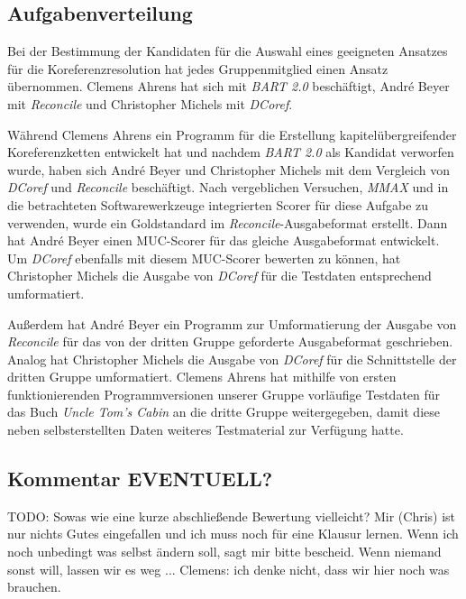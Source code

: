 \documentclass[a4paper,12pt,titlepage=true, ngerman]{scrartcl}
\begin{document}
\subsection{Aufgabenverteilung}%

Bei der Bestimmung der Kandidaten für die Auswahl eines geeigneten Ansatzes für die Koreferenzresolution 
hat jedes Gruppenmitglied einen Ansatz übernommen. 
Clemens Ahrens hat sich mit \emph{BART 2.0} beschäftigt, André Beyer mit \emph{Reconcile} und 
Christopher Michels mit \emph{DCoref}.

Während Clemens Ahrens ein Programm für die Erstellung kapitelübergreifender Koreferenzketten entwickelt hat 
und nachdem \emph{BART 2.0} als Kandidat verworfen wurde, 
haben sich André Beyer und Christopher Michels mit dem Vergleich von \emph{DCoref} 
und \emph{Reconcile} beschäftigt. 
Nach vergeblichen Versuchen, \emph{MMAX} und in die betrachteten Softwarewerkzeuge integrierten Scorer 
für diese Aufgabe zu verwenden, wurde ein Goldstandard im \emph{Reconcile}-Ausgabeformat erstellt. 
Dann hat André Beyer einen MUC-Scorer für das gleiche Ausgabeformat entwickelt. 
Um \emph{DCoref} ebenfalls mit diesem MUC-Scorer bewerten zu können, 
hat Christopher Michels die Ausgabe von \emph{DCoref} für die Testdaten entsprechend umformatiert.

Außerdem hat André Beyer ein Programm zur Umformatierung der Ausgabe von \emph{Reconcile} für das 
von der dritten Gruppe geforderte Ausgabeformat geschrieben. 
Analog hat Christopher Michels die Ausgabe von \emph{DCoref} für die Schnittstelle der dritten Gruppe umformatiert. 
Clemens Ahrens hat mithilfe von ersten funktionierenden Programmversionen unserer Gruppe vorläufige Testdaten 
für das Buch \emph{Uncle Tom's Cabin} \autocite[]{chris_uncle} an die dritte Gruppe weitergegeben, 
damit diese neben selbsterstellten Daten weiteres Testmaterial zur Verfügung hatte.


\subsection{Kommentar EVENTUELL?}\label{Kommentar}%

TODO: Sowas wie eine kurze abschließende Bewertung vielleicht? 
Mir (Chris) ist nur nichts Gutes eingefallen und ich muss noch für eine Klausur lernen. 
Wenn ich noch unbedingt was selbst ändern soll, sagt mir bitte bescheid. 
Wenn niemand sonst will, lassen wir es weg ...
Clemens: ich denke nicht, dass wir hier noch was brauchen.
\end{document}
